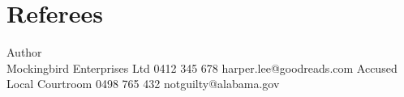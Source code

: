 \documentclass{resume}
\begin{document}
\section{Referees}{
        {Author \\ Mockingbird Enterprises Ltd}
        {0412 345 678}
        {harper.lee@goodreads.com}
        {Accused \\ Local Courtroom}
        {0498 765 432}
        {notguilty@alabama.gov}
}
\end{document}
